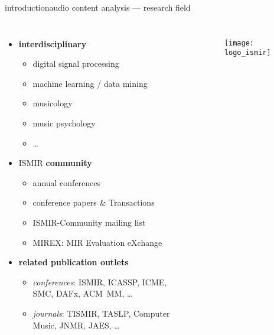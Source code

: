         \begin{frame}{introduction}{audio content analysis --- research field}
            \vspace{-7mm}
            \begin{columns}
            \begin{itemize}
                \item<1->   \textbf{interdisciplinary}
                    \begin{itemize}
                        \item   digital signal processing
                        \item   machine learning / data mining
                        \item   musicology
                        \item   music psychology
                        \item   \ldots
                    \end{itemize}
                \smallskip
                \item<2->   ISMIR \textbf{community}
                            \begin{itemize}
                                \item   annual conferences 
                                \item   conference papers \& Transactions
                                \item   ISMIR-Community mailing list
                                \item   MIREX: MIR Evaluation eXchange
                            \end{itemize}
                \smallskip
                \item<3->   \textbf{related publication outlets} 
                    \begin{itemize}
                        \item   \textit{conferences}: ISMIR, ICASSP, ICME, SMC, DAFx, ACM~MM, \ldots
                        \item   \textit{journals}: TISMIR, TASLP, Computer Music, JNMR, JAES, \ldots
                    \end{itemize}
            \end{itemize}
                \vspace{25mm}
                \begin{figure}
                    \texttt{[image: logo\_ismir]}
                \end{figure}
            \end{columns}
        \end{frame}
